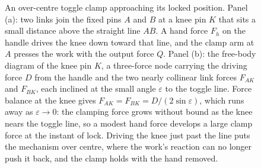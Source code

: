 \begin{figure}[htbp]
\caption[A toggle (over-centre) clamp near lock]{An over-centre toggle clamp
approaching its locked position. Panel (a): two links join the fixed pins $A$
and $B$ at a knee pin $K$ that sits a small distance above the straight line
$AB$. A hand force $F_h$ on the handle drives the knee down toward that line,
and the clamp arm at $A$ presses the work with the output force $Q$. Panel
(b): the free-body diagram of the knee pin $K$, a three-force node carrying the
driving force $D$ from the handle and the two nearly collinear link forces
$F_{AK}$ and $F_{BK}$, each inclined at the small angle $\varepsilon$ to the
toggle line. Force balance at the knee gives $F_{AK}=F_{BK}=D/(2\sin
\varepsilon)$, which runs away as $\varepsilon\to 0$: the clamping force grows
without bound as the knee nears the toggle line, so a modest hand force
develops a large clamp force at the instant of lock. Driving the knee just past
the line puts the mechanism over centre, where the work's reaction can no
longer push it back, and the clamp holds with the hand removed.}
\label{fig:vol03ch01:toggle-clamp}
\end{figure}
